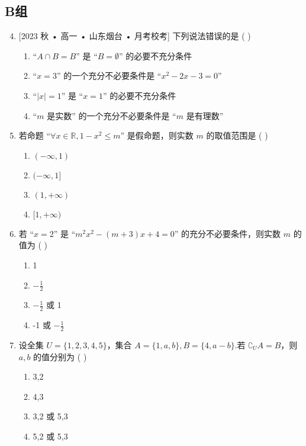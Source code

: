 \documentclass[12pt,a4paper]{ctexbook}
\theoremstyle{definition}
\theoremstyle{remark}
\begin{document}
	\subsection*{B组}
	\begin{enumerate}
		\setcounter{enumi}{3}
		\item {[2023 秋 • 高一 • 山东烟台 • 月考校考]} 下列说法错误的是 ( \hspace{2cm} )
		\begin{enumerate}
			\item “$A \cap B = B$” 是 “$B = \emptyset$” 的必要不充分条件
			\item “$x=3$” 的一个充分不必要条件是 “$x^2-2x-3=0$”
			\item “$|x|=1$” 是 “$x=1$” 的必要不充分条件
			\item “$m$ 是实数” 的一个充分不必要条件是 “$m$ 是有理数”
		\end{enumerate}
		
		\item 若命题 “$\forall x \in \mathbb{R}, 1-x^2 \le m$” 是假命题，则实数 $m$ 的取值范围是 ( \hspace{2cm} )
		\begin{enumerate}
			\item $(-\infty, 1)$
			\item $(-\infty, 1]$
			\item $(1, +\infty)$
			\item $[1, +\infty)$
		\end{enumerate}
		
		\item 若 “$x=2$” 是 “$m^2x^2 - (m+3)x + 4 = 0$” 的充分不必要条件，则实数 $m$ 的值为 ( \hspace{2cm} )
		\begin{enumerate}
			\item 1
			\item $-\frac{1}{2}$
			\item $-\frac{1}{2}$ 或 1
			\item -1 或 $-\frac{1}{2}$
		\end{enumerate}
		
		\item 设全集 $U=\{1,2,3,4,5\}$，集合 $A=\{1,a,b\}, B=\{4, a-b\}$.若 $∁_U A = B$，则 $a,b$ 的值分别为 ( \hspace{2cm} )
		\begin{enumerate}
			\item 3,2
			\item 4,3
			\item 3,2 或 5,3
			\item 5,2 或 5,3
		\end{enumerate}
	\end{enumerate}
	
\end{document}
